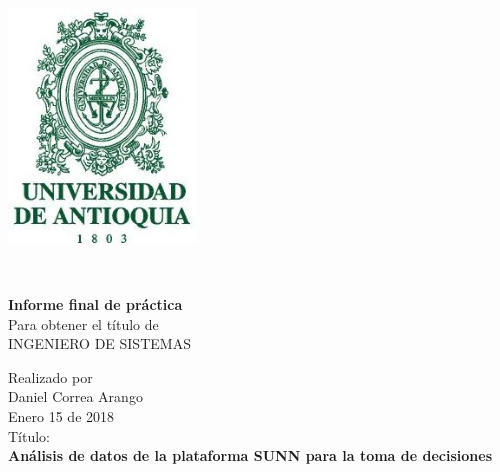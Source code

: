 \singlespacing

\begin{center}
\vspace*{-2cm}
\includegraphics[width=5cm]{images/logo}

\vspace*{2cm}
 \\
\vspace*{1cm}


\noindent \large \textbf{Informe final de práctica\\}
\vspace*{1cm}
\noindent \normalsize{Para obtener el título de}\\
\noindent \large{INGENIERO DE SISTEMAS }\\
\vspace*{1cm}

\noindent \normalsize {Realizado por\\}
\noindent \LARGE Daniel Correa Arango \\
\noindent \normalsize {Enero 15 de 2018\\}
\vspace*{1cm}
\noindent \normalsize {Título:\\}
\noindent \huge \textbf{Análisis de datos de la plataforma SUNN para la toma de decisiones} \\
\vspace*{1cm}


\end{center}

\clearpage\mbox{}
\thispagestyle{empty}
\clearpage
